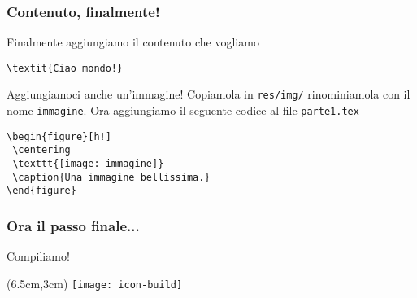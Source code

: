 \begin{frame}[fragile]
 
 \frametitle{Contenuto, finalmente!}
 
 Finalmente aggiungiamo il contenuto che vogliamo
 
 \begin{lstlisting}[frame = single, title={File res/sections/parte1.tex}]
\textit{Ciao mondo!}
 \end{lstlisting}
 
 Aggiungiamoci anche un'immagine!
 Copiamola in \texttt{res/img/} rinominiamola con il nome \texttt{immagine}. 
Ora aggiungiamo il seguente codice al file \texttt{parte1.tex}

 \begin{lstlisting}[frame = single]
\begin{figure}[h!]
 \centering
 \texttt{[image: immagine]}
 \caption{Una immagine bellissima.}
\end{figure}
 \end{lstlisting}


\end{frame}

\begin{frame}
 \frametitle{Ora il passo finale...}
 
 \huge Compiliamo!
 
 
 \begin{textblock*}{5cm}(6.5cm,3cm)
   \texttt{[image: icon-build]}
 \end{textblock*}
\end{frame}
